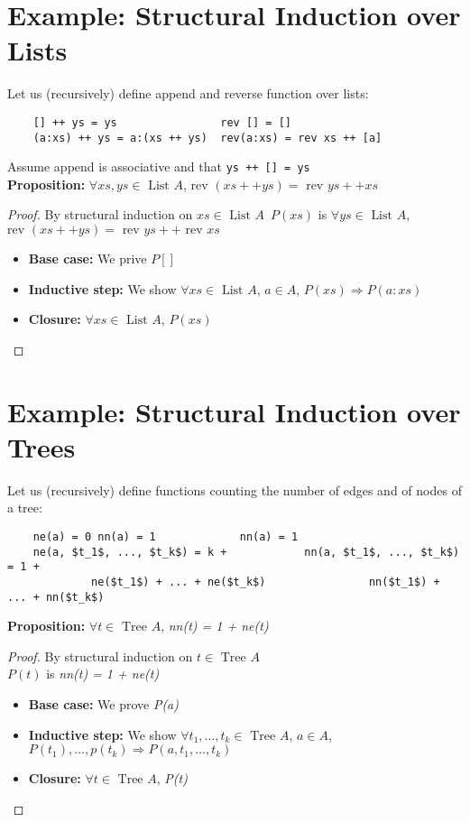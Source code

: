 \section{Example: Structural Induction over Lists} %
\label{sec:example_structural_induction_over_lists2}
Let us (recursively) define append and reverse function over lists:
\begin{lstlisting}
    [] ++ ys = ys                rev [] = []
    (a:xs) ++ ys = a:(xs ++ ys)  rev(a:xs) = rev xs ++ [a]
\end{lstlisting}
Assume append is associative and that \lstinline|ys ++ [] = ys|\\
\textbf{Proposition:} $\forall xs, ys \in \mbox{ List }A$, $\mbox{rev } (xs ++ ys) = \mbox{ rev } ys ++ xs$
\begin{proof}
    By structural induction on $xs \in \mbox{ List }A$\
    $P(xs)$ is $\forall ys \in \mbox{ List }A$, $\mbox{rev }(xs ++ ys) = \mbox{ rev }ys ++ \mbox{ rev }xs$
    \begin{itemize}
        \item \textbf{Base case:} We prive $P[]$
        \item \textbf{Inductive step:} We show $\forall xs \in \mbox{ List }A$, $a \in A$, $P(xs) \Rightarrow P(a:xs)$
        \item \textbf{Closure:} $\forall xs \in \mbox{ List }A$, $P(xs)$
    \end{itemize}
\end{proof}

\section{Example: Structural Induction over Trees} %
\label{sec:example_structural_induction_over_trees}
Let us (recursively) define functions counting the number of edges and of nodes of a tree:
\begin{lstlisting}
    ne(a) = 0 nn(a) = 1             nn(a) = 1
    ne(a, $t_1$, ..., $t_k$) = k +            nn(a, $t_1$, ..., $t_k$) = 1 +
             ne($t_1$) + ... + ne($t_k$)                nn($t_1$) + ... + nn($t_k$)
\end{lstlisting}
\textbf{Proposition:}
$\forall t \in \mbox{ Tree }A$, \emph{nn(t) = 1 + ne(t)}
\begin{proof}
    By structural induction on $t \in \mbox{ Tree }A$\\
    $P(t)$ is \emph{nn(t) = 1 + ne(t)}
    \begin{itemize}
        \item \textbf{Base case:} We prove \emph{P(a)}
        \item \textbf{Inductive step:} We show $\forall t_1,..., t_k \in \mbox{ Tree }A$, $a \in A$, $P(t_1),..., p(t_k) \Rightarrow P(a,t_1,..., t_k)$
        \item \textbf{Closure:} $\forall t \in \mbox{ Tree }A$, \emph{P(t)}
    \end{itemize}
\end{proof}


